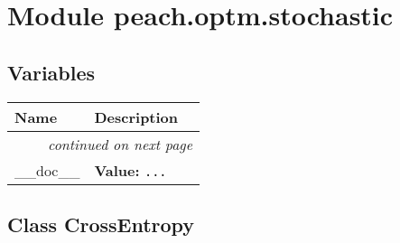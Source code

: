 %
%
%


\section{Module peach.optm.stochastic}

    \label{peach:optm:stochastic}


  \subsection{Variables}

    \vspace{-1cm}
\hspace{\varindent}\begin{longtable}{|p{\varnamewidth}|p{\vardescrwidth}|l}
\cline{1-2}
\cline{1-2} \centering \textbf{Name} & \centering \textbf{Description}& \\
\cline{1-2}
\endhead\cline{1-2}\multicolumn{3}{r}{\small\textit{continued on next page}}\\\endfoot\cline{1-2}
\endlastfoot\raggedright \_\-\_\-d\-o\-c\-\_\-\_\- & \raggedright \textbf{Value:} 
{\tt \texttt{...}}&\\
\cline{1-2}
\end{longtable}



\subsection{Class CrossEntropy}

